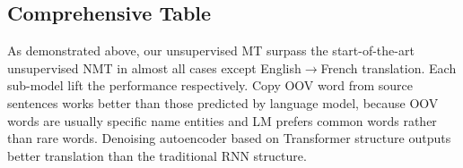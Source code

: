 \subsection{Comprehensive Table}
\begin{table}[H]
	
	\caption{Translation results on German$\leftrightarrow$English \texttt{newstest2016} and French$\leftrightarrow$English \texttt{newstest2014} }
	\centering
{}
\end{table}
As demonstrated above, our unsupervised MT surpass the start-of-the-art unsupervised NMT in almost all cases except English$\rightarrow$French translation. Each sub-model lift the performance respectively. Copy OOV word from source sentences works better than those predicted by language model, because OOV words are usually specific name entities and LM prefers common words rather than rare words. Denoising autoencoder based on Transformer structure outputs better translation than the traditional RNN structure. 


